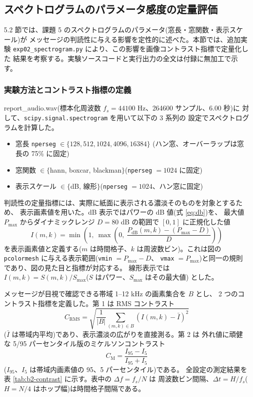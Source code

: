 \subsection{スペクトログラムのパラメータ感度の定量評価}

5.2 節では、課題 5 のスペクトログラムのパラメータ(窓長・窓関数・表示スケール)が
メッセージの判読性に与える影響を定性的に述べた。本節では、追加実験
{\tt exp02\_spectrogram.py} により、この影響を画像コントラスト指標で定量化した
結果を考察する。実験ソースコードと実行出力の全文は付録に無加工で示す。

\subsubsection{実験方法とコントラスト指標の定義}

report\_audio.wav(標本化周波数 $f_s = 44100$ Hz、264600 サンプル、6.00 秒)に
対して、{\tt scipy.signal.spectrogram}\cite{b2-scipy} を用いて以下の 3 系列の
設定でスペクトログラムを計算した。

\begin{itemize}
\item 窓長 {\tt nperseg} $\in \{128, 512, 1024, 4096, 16384\}$
      (ハン窓、オーバーラップは窓長の 75\% に固定)
\item 窓関数 $\in \{$hann, boxcar, blackman$\}$({\tt nperseg} $= 1024$ に固定)
\item 表示スケール $\in \{$dB, 線形$\}$({\tt nperseg} $= 1024$、ハン窓に固定)
\end{itemize}

判読性の定量指標には、実際に紙面に表示される濃淡そのものを対象とするため、
表示画素値を用いた。dB 表示ではパワーの dB 値(式 \ref{eq:db})を、
最大値 $P_{\max}$ からダイナミックレンジ $D = 80$ dB の範囲で
$[0, 1]$ に正規化した値
\begin{equation}\label{eq:b2-norm}
I(m,k) = \min\!\left(1,\ \max\!\left(0,\
\frac{P_{\mathrm{dB}}(m,k) - (P_{\max} - D)}{D}\right)\right)
\end{equation}
を表示画素値と定義する($m$ は時間格子、$k$ は周波数ビン)。これは図の
{\tt pcolormesh} に与える表示範囲({\tt vmin} $= P_{\max} - D$、
{\tt vmax} $= P_{\max}$)と同一の規則であり、図の見た目と指標が対応する。
線形表示では $I(m,k) = S(m,k)/S_{\max}$($S$ はパワー、$S_{\max}$ はその最大値)
とした。

メッセージが目視で確認できる帯域 1--12 kHz の画素集合を $B$ とし、
2 つのコントラスト指標を定義した。第 1 は RMS コントラスト
\begin{equation}\label{eq:b2-rms}
C_{\mathrm{RMS}} = \sqrt{\frac{1}{|B|} \sum_{(m,k) \in B}
\left( I(m,k) - \bar{I} \right)^2}
\end{equation}
($\bar{I}$ は帯域内平均)であり、表示濃淡の広がりを直接測る。第 2 は
外れ値に頑健な 5/95 パーセンタイル版のミケルソンコントラスト
\begin{equation}\label{eq:b2-mic}
C_{\mathrm{M}} = \frac{I_{95} - I_{5}}{I_{95} + I_{5}}
\end{equation}
($I_{95}$、$I_{5}$ は帯域内画素値の 95、5 パーセンタイル)である。
全設定の測定結果を表 \ref{tab:b2-contrast} に示す。表中の $\Delta f = f_s/N$ は
周波数ビン間隔、$\Delta t = H/f_s$($H = N/4$ はホップ幅)は時間格子間隔である。

